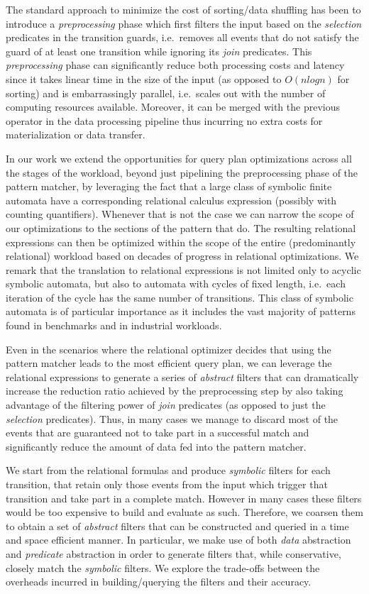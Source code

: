 The standard approach to minimize the cost of sorting/data shuffling has been 
to introduce a {\em preprocessing} phase which first filters the input based on 
the {\em selection} predicates in the transition guards, i.e.\ removes all 
events that do not satisfy the guard of at least one transition while ignoring 
its {\em join} predicates.
This {\em preprocessing} phase can significantly reduce both processing costs 
and latency since it takes linear time in the size of the input (as opposed to 
$O(nlogn)$ for sorting) and is embarrassingly parallel, i.e.\ scales out with 
the number of computing resources available.
Moreover, it can be merged with the previous operator in the data processing 
pipeline thus incurring no extra costs for materialization or data transfer.    


In our work we extend the opportunities for query plan optimizations across all 
the stages of the workload, beyond just pipelining the preprocessing phase of 
the pattern matcher, by leveraging the fact that a large class of symbolic 
finite automata have a corresponding relational calculus expression (possibly 
with counting quantifiers).
Whenever that is not the case we can narrow the scope of our optimizations to 
the sections of the pattern that do.
The resulting relational expressions can then be optimized within the scope of 
the entire (predominantly relational) workload based on decades of progress in 
relational optimizations.  
We remark that the translation to relational expressions is not limited only to 
acyclic symbolic automata, but also to automata with cycles of fixed length, 
i.e.\ each iteration of the cycle has the same number of transitions.
This class of symbolic automata is of particular importance as it includes the 
vast majority of patterns found in benchmarks and in industrial workloads.  


Even in the scenarios where the relational optimizer decides that using the 
pattern matcher leads to the most efficient query plan, we can leverage the 
relational expressions to generate a series of {\em abstract} filters that can 
dramatically increase the reduction ratio achieved by the preprocessing step by 
also taking advantage of the filtering power of {\em join} predicates (as 
opposed to just the {\em selection} predicates).   
Thus, in many cases we manage to discard most of the events that are guaranteed 
not to take part in a successful match and significantly reduce the amount of 
data fed into the pattern matcher.

We start from the relational formulas and produce {\em symbolic} filters for 
each transition, that retain only those events from the input which trigger 
that transition and take part in a complete match.
However in many cases these filters would be too expensive to build and 
evaluate as such.
Therefore, we coarsen them to obtain a set of {\em abstract} filters
that can be constructed and queried in a time and space efficient manner.
In particular, we make use of both {\em data} abstraction and {\em predicate} 
abstraction in order to generate filters that, while conservative, closely 
match the {\em symbolic} filters. 
We explore the trade-offs between the overheads incurred in building/querying
the filters and their accuracy. 


